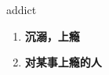 
\begin{frame}
{\huge addict}
\begin{center}
\begin{enumerate}\Large
  \item \textbf{沉溺，上瘾}
  \item \textbf{对某事上瘾的人}
\end{enumerate}
\end{center}
\end{frame}
